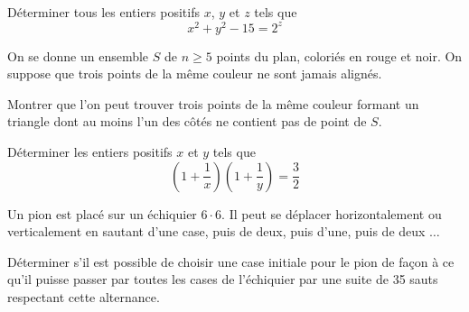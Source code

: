 

\begin{exo}
Déterminer tous les entiers positifs $x$, $y$ et $z$ tels que
$$x^2+ y^2 - 15 = 2^z$$
\end{exo}


\begin{exo}
On se donne un ensemble $S$ de $n \ge 5$ points du plan, coloriés en rouge et noir.
On suppose que trois points de la même couleur ne sont jamais alignés.

Montrer que l'on peut trouver trois points de la même couleur formant un triangle dont au moins l'un des côtés ne contient pas de point de $S$.
\end{exo}


\begin{exo}
Déterminer les entiers positifs $x$ et $y$ tels que
$$\left(1 + \frac 1x\right) \left(1 + \frac 1y\right) = \frac 32$$
\end{exo}


\begin{exo}
Un pion est placé sur un échiquier $6 \cdot 6$. Il peut se déplacer horizontalement ou verticalement en sautant d'une case, puis de deux, puis d'une, puis de deux $\ldots$

Déterminer s'il est possible de choisir une case initiale pour le pion de façon à ce qu'il puisse passer par toutes les cases de l'échiquier par une suite de 35 sauts respectant cette alternance.
\end{exo}




